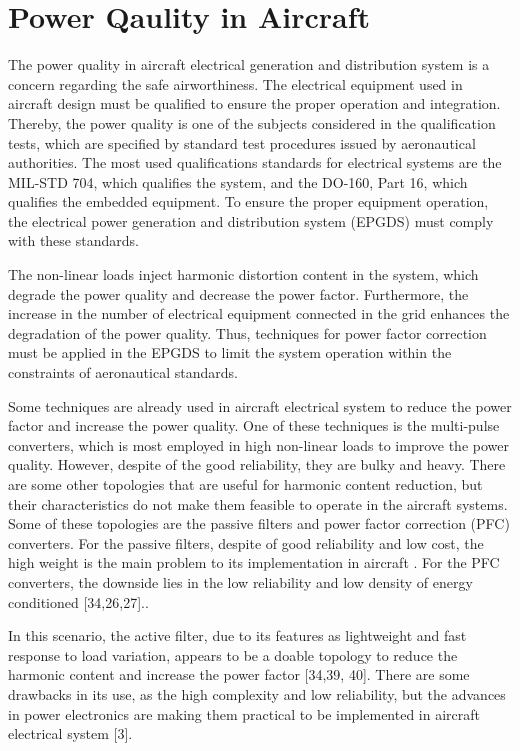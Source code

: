 \section{Power Qaulity in Aircraft}\label{sec:Power_Quality}

The power quality in aircraft electrical generation and distribution system is a concern regarding the safe airworthiness. The electrical equipment used in aircraft design must be qualified to ensure the proper operation and integration. Thereby, the power quality is one of the subjects considered in the qualification tests, which are specified by standard test procedures issued by aeronautical authorities. The most used qualifications standards for electrical systems are the MIL-STD 704, which qualifies the system, and the DO-160, Part 16, which qualifies the embedded equipment. To ensure the proper equipment operation, the electrical power generation and distribution system (EPGDS) must comply with these standards.

The non-linear loads inject harmonic distortion content in the system, which degrade the power quality and decrease the power factor. Furthermore, the increase in the number of electrical equipment connected in the grid enhances the degradation of the power quality. Thus, techniques for power factor correction must be applied in the EPGDS to limit the system operation within the constraints of aeronautical standards.

Some techniques are already used in aircraft electrical system to reduce the power factor and increase the power quality. One of these techniques is the multi-pulse converters, which is most employed in high non-linear loads to improve the power quality. However, despite of the good reliability, they are bulky and heavy. There are some other topologies that are useful for harmonic content reduction, but their characteristics do not make them feasible to operate in the aircraft systems. Some of these topologies are the passive filters and power factor correction (PFC) converters. For the passive filters, despite of good reliability and low cost, the high weight is the main problem to its implementation in aircraft \cite{Barruel2004}. For the PFC converters, the downside lies in the low reliability and low density of energy conditioned \cite{Zhu2014,Gong2003,Lobo2005} [34,26,27].. 

In this scenario, the active filter, due to its features as lightweight and fast response to load variation, appears to be a doable topology to reduce the harmonic content and increase the power factor \cite{Zhu2014,Chen2012control,Karatzaferis2013} [34,39, 40]. There are some drawbacks in its use, as the high complexity and low reliability, but the advances in power electronics are making them practical to be implemented in aircraft electrical system \cite{Abdelhafez2009} [3].





